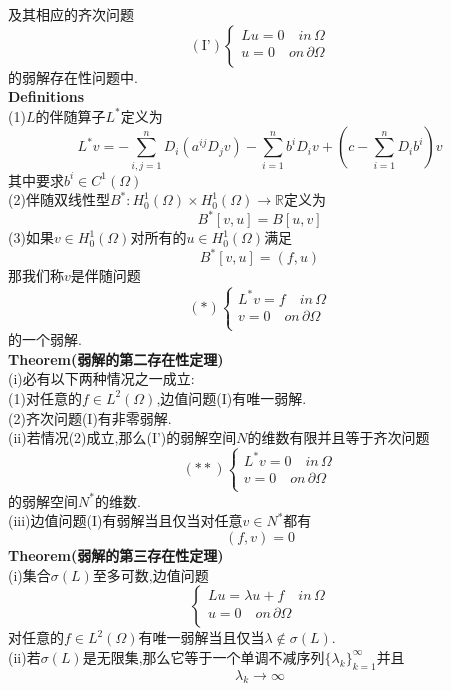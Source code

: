 \documentclass[a4paper,UTF8,12pt]{ctexart}
\begin{document}
及其相应的齐次问题
$$(\text{I'})
\begin{cases}
    Lu= 0\quad in \, \Omega\\
     u= 0\quad on \, \partial\Omega\\ 
\end{cases}
$$
的弱解存在性问题中.\\
\textbf{Definitions}\\
(1)$L$的伴随算子$L^*$定义为
$$
L^*v = -\sum^n_{i,j=1}D_i(a^{ij}D_jv)-\sum^n_{i=1}b^iD_iv+(c-\sum^n_{i=1}D_ib^i)v
$$
其中要求$b^i\in C^1(\Omega)$\\
(2)伴随双线性型$B^*:H^1_0(\Omega)\times H^1_0(\Omega)\to \mathbb{R}$定义为
$$
B^*[v,u]=B[u,v]
$$
(3)如果$v\in H^1_0(\Omega)$对所有的$u\in H^1_0(\Omega)$满足
$$
B^*[v,u]=(f,u)
$$
那我们称$v$是伴随问题
$$(*)
\begin{cases}
    L^*v= f\quad in \, \Omega\\
     v= 0\quad on \, \partial\Omega\\ 
\end{cases}
$$
的一个弱解.\\
\textbf{Theorem(弱解的第二存在性定理)}\\
(i)必有以下两种情况之一成立:\\
(1)对任意的$f\in L^2(\Omega)$,边值问题(I)有唯一弱解.\\
(2)齐次问题(I)有非零弱解.\\
(ii)若情况(2)成立,那么(I')的弱解空间$N$的维数有限并且等于齐次问题
$$(**)
\begin{cases}
    L^*v= 0\quad in \, \Omega\\
     v= 0\quad on \, \partial\Omega\\ 
\end{cases}
$$
的弱解空间$N^*$的维数.\\
(iii)边值问题(I)有弱解当且仅当对任意$v\in N^*$都有
$$
(f,v)=0
$$
\textbf{Theorem(弱解的第三存在性定理)}\\
(i)集合$\sigma (L)$至多可数,边值问题
$$
\begin{cases}
    Lu= \lambda u+f\quad in \, \Omega\\
     u= 0\quad on \, \partial\Omega\\ 
\end{cases}
$$
对任意的$f\in L^2(\Omega)$有唯一弱解当且仅当$\lambda\notin \sigma (L)$.\\
(ii)若$\sigma (L)$是无限集,那么它等于一个单调不减序列$\{\lambda _k\}^\infty _{k=1}$并且
$$
\lambda _k\to \infty
$$
\end{document}
